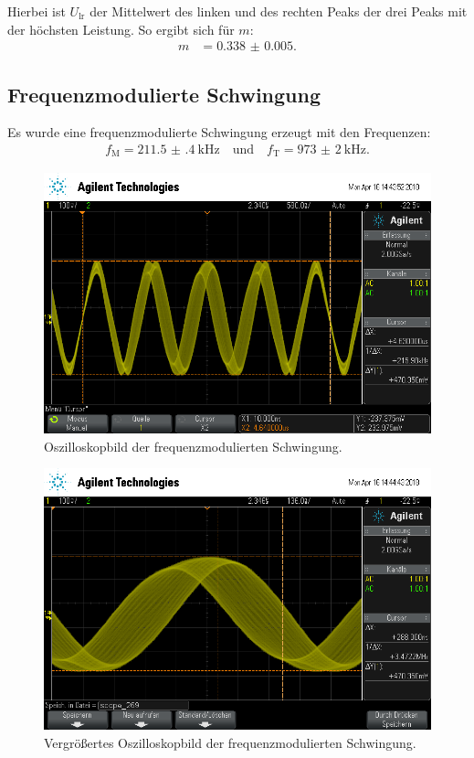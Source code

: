 Hierbei ist $U_\text{lr}$ der Mittelwert des linken und des rechten Peaks der drei Peaks mit der höchsten Leistung.
So ergibt sich für $m$:
\begin{align*}
  m &= \num{0.338(5)}.
\end{align*}

\subsection{Frequenzmodulierte Schwingung}

Es wurde eine frequenzmodulierte Schwingung erzeugt mit den Frequenzen:
\begin{align*}
  f_\text{M} = \SI{211.5(4)}{\kilo\hertz} \quad\text{und}\quad f_\text{T} = \SI{973(2)}{\kilo\hertz}.
\end{align*}
\begin{figure}[h]
  \centering
  \includegraphics[width=.9\textwidth]{Oszi_Pics/freqModRing.png}
  \caption{Oszilloskopbild der frequenzmodulierten Schwingung.}
  \label{fig:freqModRing}
\end{figure}
\begin{figure}[h]
  \centering
  \includegraphics[width=.9\textwidth]{Oszi_Pics/freqModZoom.png}
  \caption{Vergrößertes Oszilloskopbild der frequenzmodulierten Schwingung.}
  \label{fig:freqModZoom}
\end{figure}
